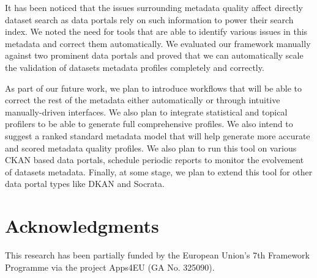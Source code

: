 \documentclass[runningheads,a4paper]{llncs}
\begin{document}
It has been noticed that the issues surrounding metadata quality affect directly dataset search as data portals rely on such information to power their search index. We noted the need for tools that are able to identify various issues in this metadata and correct them automatically. We evaluated our framework manually against two prominent data portals and proved that we can automatically scale the validation of datasets metadata profiles completely and correctly.

As part of our future work, we plan to introduce workflows that will be able to correct the rest of the metadata either automatically or through intuitive manually-driven interfaces. We also plan to integrate statistical and topical profilers to be able to generate full comprehensive profiles. We also intend to suggest a ranked standard metadata model that will help generate more accurate and scored metadata quality profiles. We also plan to run this tool on various CKAN based data portals, schedule periodic reports to monitor the evolvement of datasets metadata. Finally, at some stage, we plan to extend this tool for other data portal types like DKAN and Socrata.


\section*{Acknowledgments}
This research has been partially funded by the European Union's 7th Framework Programme via the project Apps4EU (GA No. 325090).
\vspace{0.5cm}


\nocite{*}

\end{document}
